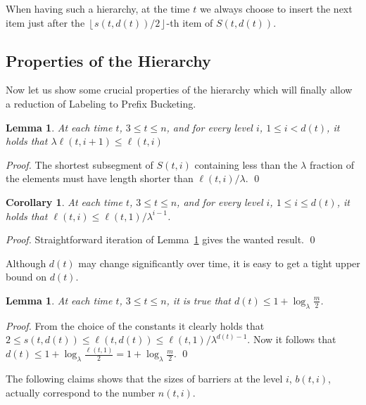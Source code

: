 \documentclass{llncs}
\newtheorem{lemma}[definition]{Lemma}
\newtheorem{corollary}[definition]{Corollary}
\newcommand{\hb}[2]{b\left(#1, #2\right)}
\newcommand{\hn}[2]{n\left(#1, #2\right)}
\newcommand{\hs}[2]{s\left(#1, #2\right)}
\newcommand{\hS}[2]{S\left(#1, #2\right)}
\newcommand{\hl}[2]{\ell(#1, #2)}
\newcommand{\htz}{3}
\begin{document}
When having such a hierarchy, at the time $t$ we always choose to insert the next item just after the $\left\lfloor \hs{t}{d(t)} / 2 \right\rfloor$-th item of $\hS{t}{d(t)}$.

\subsection{Properties of the Hierarchy}

Now let us show some crucial properties of the hierarchy which will finally allow a reduction of Labeling to Prefix Bucketing.

\begin{lemma}
\label{lm:halving}
At each time $t$, $\htz \leq t \leq n$, and for every level $i$, $1 \leq i < d(t)$, it holds that $\lambda \hl{t}{i + 1} \leq \hl{t}{i}$
\end{lemma}
\begin{proof}
The shortest subsegment of $\hS{t}{i}$ containing less than the $\lambda$ fraction of the elements must have length shorter than $\hl{t}{i} / \lambda$.
\qed
\end{proof}

\begin{corollary}
\label{cor:decreasing_segment_size}
At each time $t$, $\htz \leq t \leq n$, and for every level $i$, $1 \leq i \leq d(t)$, it holds that $\hl{t}{i} \leq \hl{t}{1}/\lambda^{i-1}$.
\end{corollary}
\begin{proof}
Straightforward iteration of Lemma~\ref{lm:halving} gives the wanted result.
\qed
\end{proof}

Although $d(t)$ may change significantly over time, it is easy to get a tight upper bound on $d(t)$.

\begin{lemma}
\label{lm:d_bound}
At each time $t$, $\htz \leq t \leq n$, it is true that $d(t) \leq 1 + \log_\lambda \frac{m}{2}$.
\end{lemma}
\begin{proof}
From the choice of the constants it clearly holds that $2 \leq \hs{t}{d(t)} \leq \hl{t}{d(t)} \leq \hl{t}{1}/\lambda^{d(t)-1}$.
Now it follows that $d(t) \leq 1 + \log_\lambda \frac{\hl{t}{1}}{2} = 1 + \log_\lambda \frac{m}{2}$.
\qed
\end{proof}

The following claims shows that the sizes of barriers at the level $i$, $\hb{t}{i}$, actually correspond to the number $\hn{t}{i}$.
\end{document}
